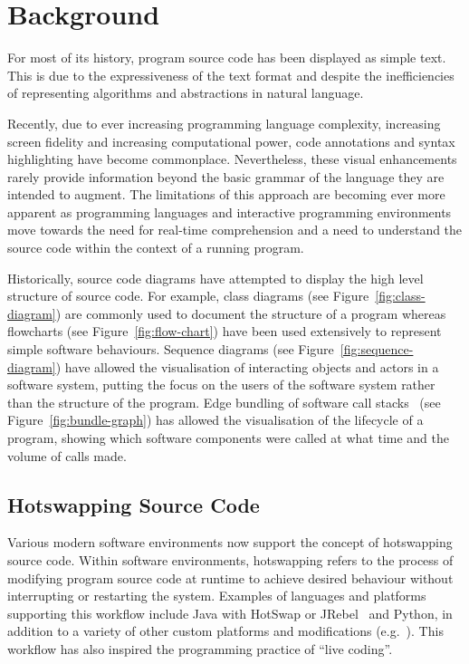 

\section{Background}

For most of its history, program source code has been displayed as simple text. This is due to the expressiveness of the text format and despite the inefficiencies of representing algorithms and abstractions in natural language.

Recently, due to ever increasing programming language complexity, increasing screen fidelity and increasing computational power, code annotations and syntax highlighting have become commonplace. Nevertheless, these visual enhancements rarely provide information beyond the basic grammar of the language they are intended to augment. The limitations of this approach are becoming ever more apparent as programming languages and interactive programming environments move towards the need for real-time comprehension and a need to understand the source code within the context of a running program.

Historically, source code diagrams have attempted to display the high level structure of source code. For example, class diagrams (see Figure~\ref{fig:class-diagram}) are commonly used to document the structure of a program whereas flowcharts (see Figure~\ref{fig:flow-chart}) have been used extensively to represent simple software behaviours. Sequence diagrams (see Figure~\ref{fig:sequence-diagram}) have allowed the visualisation of interacting objects and actors in a software system, putting the focus on the users of the software system rather than the structure of the program. Edge bundling of software call stacks~\cite{Zhou2013} (see Figure~\ref{fig:bundle-graph}) has allowed the visualisation of the lifecycle of a program, showing which software components were called at what time and the volume of calls made.

\subsection{Hotswapping Source Code}

Various modern software environments now support the concept of hotswapping source code. Within software environments, hotswapping refers to the process of modifying program source code at runtime to achieve desired behaviour without interrupting or restarting the system. Examples of languages and platforms supporting this workflow include Java with HotSwap or JRebel~\cite{ZeroTurnaround2014} and Python, in addition to a variety of other custom platforms and modifications (e.g.~\cite{Thomas2011}). This workflow has also inspired the programming practice of ``live coding''. 

